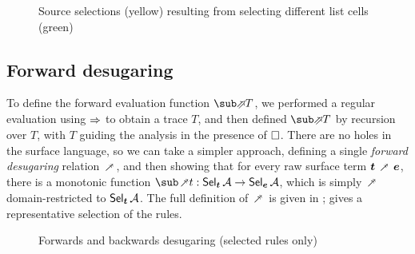 \begin{figure}
   \begin{subfigure}{0.48\textwidth}
      \small
      
   \end{subfigure}
   \hfill
   \begin{subfigure}{0.48\textwidth}
      \small
      
   \end{subfigure}
   \vspace{-3mm}
   \caption{Source selections (yellow) resulting from selecting different list cells (green)}
   \vspace{-2mm}
\label{fig:surface-language:example-1}
\end{figure}

\subsection{Forward desugaring}

To define the forward evaluation function $\evalFwdF{T}$, we performed a regular evaluation using $\Rightarrow$ to obtain a trace $T$, and then defined $\evalFwdF{T}$ by recursion over $T$, with $T$ guiding the analysis in the presence of $\square$. There are no holes in the surface language, so we can take a simpler approach, defining a single \emph{forward desugaring} relation $\desugarFwdR$, and then showing that for every raw surface term $\raw{t} \desugarFwdR \raw{e}$, there is a monotonic function $\desugarFwdF{t}: \Sel{\raw{t}}{A} \to \Sel{\raw{e}}{A}$, which is simply $\desugarFwdR$ domain-restricted to $\textup{\textsf{Sel}}_{\bm{t}}\,{\mathcal{A}}$. The full definition of $\desugarFwdR$ is \ifappendices given in  \else \IncludedWithSupplementaryMaterial \fi;  gives a representative selection of the rules.

\begin{figure}
   
   \caption{Forwards and backwards desugaring (selected rules only)}
   \label{fig:surface-language:desugar}
\end{figure}

